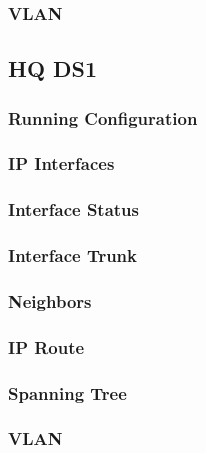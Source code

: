\subsubsection{VLAN}






\subsection{HQ DS1}
\subsubsection{Running Configuration}


\subsubsection{IP Interfaces}


\subsubsection{Interface Status}


\subsubsection{Interface Trunk}


\subsubsection{Neighbors}


\subsubsection{IP Route}


\subsubsection{Spanning Tree}


\subsubsection{VLAN}






